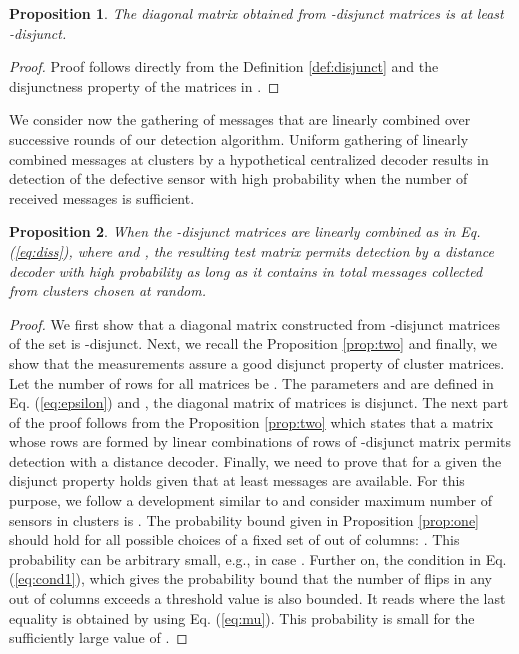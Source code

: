 \documentclass[journal]{IEEEtran}
\newtheorem{prop}{Proposition}
\begin{document}
\begin{prop}
The diagonal matrix  obtained from -disjunct matrices   is at least -disjunct.
\label{prop:three}
\end{prop}
\begin{proof}
Proof follows directly from the Definition \ref{def:disjunct} and the disjunctness property of the matrices in . 
\end{proof}
We consider now the gathering of messages that are linearly combined over successive rounds of our detection algorithm. Uniform gathering of linearly combined messages at  clusters by a hypothetical centralized decoder results in detection of the defective sensor with high probability when the number of received messages is sufficient. 
\begin{prop}
When the -disjunct matrices  are linearly combined as in Eq. (\ref{eq:diss}), where  and , the resulting test matrix permits detection by a distance decoder with high probability as long as it contains in total  messages collected from clusters chosen at random.
\label{prop:four}
\end{prop}
\begin{proof}
We first show that a diagonal matrix constructed from -disjunct matrices of the set  is -disjunct. Next, we recall the Proposition \ref{prop:two} and finally, we show that the  measurements assure a good disjunct property of cluster matrices. Let the number of rows for all matrices be . The parameters   and  are defined in Eq. (\ref{eq:epsilon}) and , the diagonal matrix of  matrices is  disjunct. 
The next part of the proof follows from the Proposition \ref{prop:two} which states that a matrix whose rows are formed by linear combinations of rows of -disjunct matrix permits detection with a distance decoder. Finally, we need to prove that for a given  the disjunct property holds given that at least  messages are available. For this purpose, we follow a development similar to \cite{Cheraghchi:11} and consider maximum number of sensors in clusters is . The probability bound given in Proposition \ref{prop:one} should hold for all possible choices of a fixed set of  out of  columns: . This probability can be arbitrary small, e.g., in case . Further on, the condition in Eq. (\ref{eq:cond1}), which gives the probability bound that the number of flips in any  out of  columns exceeds a threshold value  is also bounded. It reads  where the last equality is obtained by using Eq. (\ref{eq:mu}). This probability is small for the sufficiently large value of . 
\end{proof}
\end{document}
